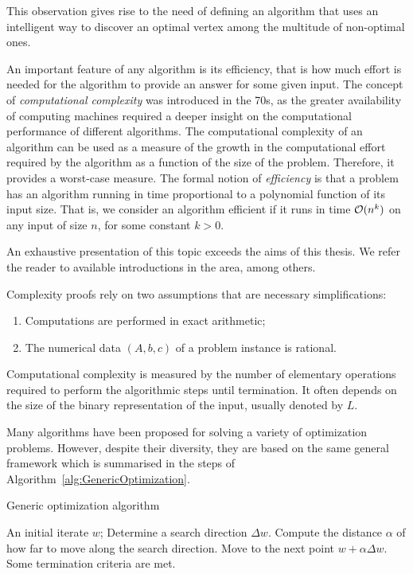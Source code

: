 This observation gives rise to the need of defining an algorithm
that uses an intelligent way to discover an optimal vertex 
among the multitude of non-optimal ones.

An important feature of any algorithm is its efficiency, that is 
how much effort is needed for the algorithm to provide an answer
for some given input.
The concept of {\em computational complexity} was introduced in the 70s,
as the greater availability of computing machines required a deeper insight
on the computational performance of different algorithms.
The computational complexity of an algorithm can be used as a measure
of the growth in the computational effort required by the algorithm
as a function of the size of the problem. Therefore, it provides 
a worst-case measure.
The formal notion of {\em efficiency} is that a problem has an 
algorithm running in time proportional to a polynomial function 
of its input size. That is, we consider an algorithm efficient
 if it runs in time $\mathcal{O}(n^k)$ on any input of size $n$, 
for some constant $k>0$.

An exhaustive presentation of this topic exceeds the aims of this thesis.
We refer the reader to available introductions in the area, 
\cite[Chapter~2]{Schrijver86} among others.

Complexity proofs rely on two assumptions that are necessary 
simplifications:
\begin{enumerate}
\item Computations are performed in exact arithmetic;
\item The numerical data $(A, b, c)$ of a problem instance is rational.
\end{enumerate}

Computational complexity is measured by the number of elementary operations
required to perform the algorithmic steps until termination. It often depends 
on the size of the binary representation of the input,
usually denoted by $L$.

Many algorithms have been proposed for solving a variety of optimization
problems. However, despite their diversity, they are based on the same 
general framework which is summarised in the steps of 
Algorithm~\ref{alg:GenericOptimization}.

\renewcommand{\algorithmicrequire}{\textbf{Given:}}
\renewcommand{\algorithmicrepeat}{\textbf{Repeat:}}
\renewcommand{\algorithmicuntil}{\textbf{Until}}
\begin{algorithm}[ht]
  \caption{Generic optimization algorithm}
    \begin{algorithmic}  \label{alg:GenericOptimization}
      \REQUIRE An initial iterate $w$;
      \smallskip
      \REPEAT
         \STATE Determine a search direction $\Delta w$.
         \smallskip
         \STATE Compute the distance $\alpha$ of how far to move along
	        the search direction.
         \smallskip
         \STATE Move to the next point $w + \alpha\Delta w$.
         \smallskip
      \UNTIL Some termination criteria are met.
  \end{algorithmic}
\end{algorithm}

